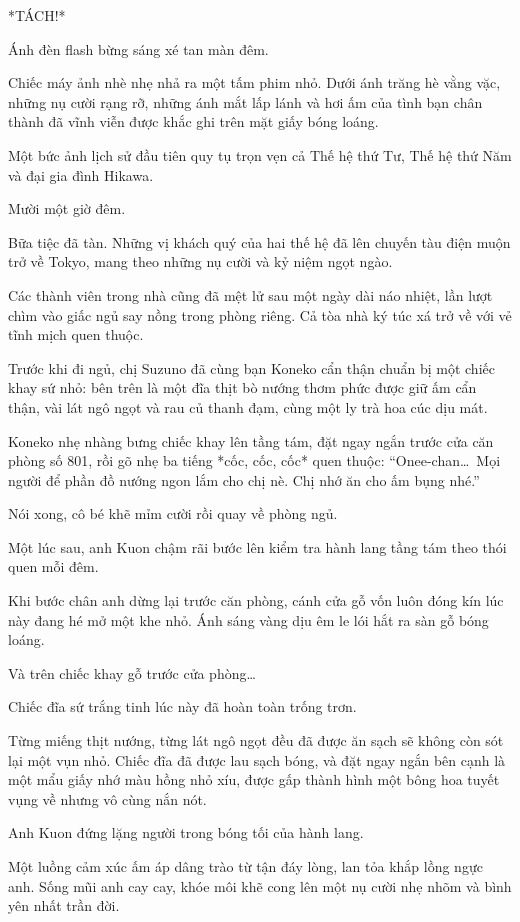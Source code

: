\documentclass[../main.tex]{subfiles}
\begin{document}
*TÁCH!*

Ánh đèn flash bừng sáng xé tan màn đêm.

Chiếc máy ảnh nhè nhẹ nhả ra một tấm phim nhỏ. Dưới ánh trăng hè vằng vặc, những nụ cười rạng rỡ, những ánh mắt lấp lánh và hơi ấm của tình bạn chân thành đã vĩnh viễn được khắc ghi trên mặt giấy bóng loáng.

Một bức ảnh lịch sử đầu tiên quy tụ trọn vẹn cả Thế hệ thứ Tư, Thế hệ thứ Năm và đại gia đình Hikawa.

\ct

Mười một giờ đêm.

Bữa tiệc đã tàn. Những vị khách quý của hai thế hệ đã lên chuyến tàu điện muộn trở về Tokyo, mang theo những nụ cười và kỷ niệm ngọt ngào.

Các thành viên trong nhà cũng đã mệt lử sau một ngày dài náo nhiệt, lần lượt chìm vào giấc ngủ say nồng trong phòng riêng. Cả tòa nhà ký túc xá trở về với vẻ tĩnh mịch quen thuộc.

Trước khi đi ngủ, chị Suzuno đã cùng bạn Koneko cẩn thận chuẩn bị một chiếc khay sứ nhỏ: bên trên là một đĩa thịt bò nướng thơm phức được giữ ấm cẩn thận, vài lát ngô ngọt và rau củ thanh đạm, cùng một ly trà hoa cúc dịu mát.

Koneko nhẹ nhàng bưng chiếc khay lên tầng tám, đặt ngay ngắn trước cửa căn phòng số 801, rồi gõ nhẹ ba tiếng *cốc, cốc, cốc* quen thuộc: ``Onee-chan\dots\ Mọi người để phần đồ nướng ngon lắm cho chị nè. Chị nhớ ăn cho ấm bụng nhé.''

Nói xong, cô bé khẽ mỉm cười rồi quay về phòng ngủ.

Một lúc sau, anh Kuon chậm rãi bước lên kiểm tra hành lang tầng tám theo thói quen mỗi đêm.

Khi bước chân anh dừng lại trước căn phòng, cánh cửa gỗ vốn luôn đóng kín lúc này đang hé mở một khe nhỏ. Ánh sáng vàng dịu êm le lói hắt ra sàn gỗ bóng loáng.

Và trên chiếc khay gỗ trước cửa phòng\dots

Chiếc đĩa sứ trắng tinh lúc này đã hoàn toàn trống trơn.

Từng miếng thịt nướng, từng lát ngô ngọt đều đã được ăn sạch sẽ không còn sót lại một vụn nhỏ. Chiếc đĩa đã được lau sạch bóng, và đặt ngay ngắn bên cạnh là một mẩu giấy nhớ màu hồng nhỏ xíu, được gấp thành hình một bông hoa tuyết vụng về nhưng vô cùng nắn nót.

Anh Kuon đứng lặng người trong bóng tối của hành lang.

Một luồng cảm xúc ấm áp dâng trào từ tận đáy lòng, lan tỏa khắp lồng ngực anh. Sống mũi anh cay cay, khóe môi khẽ cong lên một nụ cười nhẹ nhõm và bình yên nhất trần đời.
\end{document}
